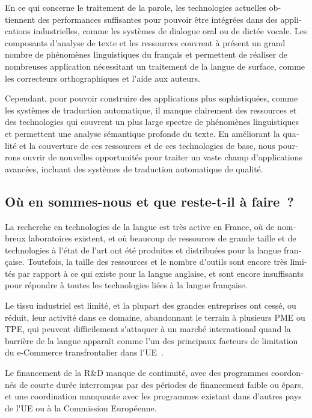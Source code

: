 \documentclass[]{../metanetpaper}
\begin{document}
\begin{french}
\begin{multicols}{2}
En ce qui concerne le traitement de la parole, les technologies
actuelles obtiennent des performances suffisantes pour pouvoir être
intégrées dans des applications industrielles, comme les systèmes de
dialogue oral ou de dictée vocale. Les composants d{\mbox '}analyse de texte et les
ressources couvrent à présent un grand nombre de phénomènes
linguistiques du français et permettent de réaliser de nombreuses
application nécessitant un traitement de la langue de surface,
comme les correcteurs orthographiques et l{\mbox '}aide aux auteurs.

Cependant, pour pouvoir construire des applications plus
sophistiquées, comme les systèmes de traduction automatique, il manque
clairement des ressources et des technologies qui couvrent un plus
large spectre de phénomènes linguistiques et permettent une analyse
sémantique profonde du texte. En améliorant la qualité et la
couverture de ces ressources et de ces technologies de base, nous
pourrons ouvrir de nouvelles opportunités pour traiter un vaste champ
d{\mbox '}applications avancées, incluant des systèmes de traduction
automatique de qualité.

\subsection{Où en sommes-nous et que reste-t-il à faire~?}

La recherche en technologies de la langue est très active en France,
où de nombreux laboratoires existent, et où beaucoup de ressources de
grande taille et de technologies à l{\mbox '}état de l{\mbox '}art ont été produites
et distribuées pour la langue française. Toutefois, la taille des
ressources et le nombre d{\mbox '}outils sont encore très limités par rapport
à ce qui existe pour la langue anglaise, et sont encore insuffisants
pour répondre à toutes les technologies liées à la langue française.

Le tissu industriel est limité, et la plupart des grandes entreprises
ont cessé, ou réduit, leur activité dans ce domaine, abandonnant le
terrain à plusieurs PME ou TPE, qui peuvent difficilement s{\mbox '}attaquer à
un marché international quand la barrière de la langue apparaît comme
l{\mbox '}un des principaux facteurs de limitation du {\mbox e-Commerce}
transfrontalier dans l{\mbox '}UE~\cite{euconclusion}.

Le financement de la R\&D manque de continuité, avec des programmes
coordonnés de courte durée interrompus par des périodes de financement
faible ou épars, et une coordination manquante avec les programmes
existant dans d{\mbox '}autres pays de l{\mbox '}UE ou à la Commission Européenne.


\end{multicols}
\end{french}
\end{document}

